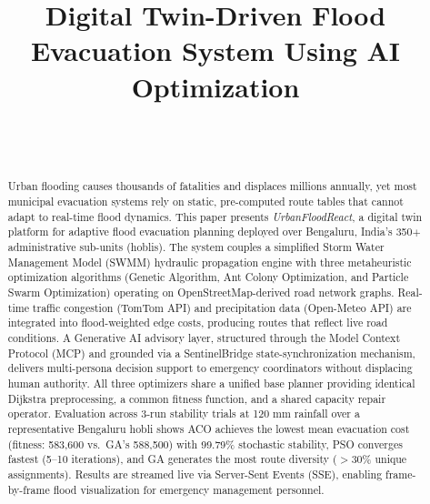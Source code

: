\documentclass[journal]{IEEEtran}
\begin{document}
\title{Digital Twin-Driven Flood Evacuation System Using AI Optimization}

\author{
  \\
  \\
}

\maketitle

\begin{abstract}
Urban flooding causes thousands of fatalities and displaces millions annually, yet most
municipal evacuation systems rely on static, pre-computed route tables that cannot adapt
to real-time flood dynamics. This paper presents \textit{UrbanFloodReact}, a digital twin
platform for adaptive flood evacuation planning deployed over Bengaluru, India's
350$+$ administrative sub-units (hoblis). The system couples a simplified Storm Water
Management Model (SWMM) hydraulic propagation engine with three metaheuristic optimization
algorithms (Genetic Algorithm, Ant Colony Optimization, and Particle Swarm Optimization)
operating on OpenStreetMap-derived road network graphs. Real-time traffic congestion
(TomTom API) and precipitation data (Open-Meteo API) are integrated into flood-weighted
edge costs, producing routes that reflect live road conditions. A Generative AI advisory
layer, structured through the Model Context Protocol (MCP) and grounded via a
SentinelBridge state-synchronization mechanism, delivers multi-persona decision support
to emergency coordinators without displacing human authority. All three optimizers share a
unified base planner providing identical Dijkstra preprocessing, a common fitness function,
and a shared capacity repair operator. Evaluation across 3-run stability trials at 120 mm
rainfall over a representative Bengaluru hobli shows ACO achieves the lowest mean
evacuation cost (fitness: 583,600 vs.\ GA's 588,500) with 99.79\% stochastic stability,
PSO converges fastest (5--10 iterations), and GA generates the most route diversity
($>$30\% unique assignments). Results are streamed live via Server-Sent Events (SSE),
enabling frame-by-frame flood visualization for emergency management personnel.
\end{abstract}
\end{document}
